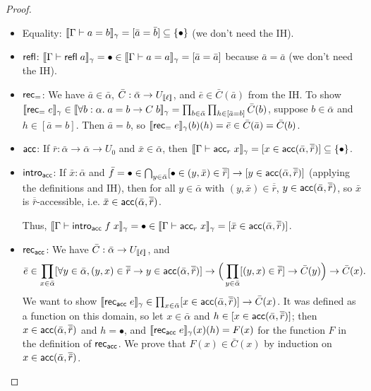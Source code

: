 \begin{proof}
\begin{itemize}
\item Equality: $\scott{\Gamma\vdash a=b}_\gamma=[\bar a=\bar b]\subseteq\{\bullet\}$ (we don't need the IH).
\item $\mathsf{refl}$: $\scott{\Gamma\vdash \refl\;a}_\gamma=\bullet\in\scott{\Gamma\vdash a=a}_\gamma=[\bar a=\bar a]$ because $\bar a=\bar a$ (we don't need the IH).
\item $\mathsf{rec}_=$: We have $\bar a\in\bar\alpha$, $\bar C:\bar\alpha\to U_{\llbracket \ell\rrbracket}$, and $\bar e\in\bar C(\bar a)$ from the IH. To show $\llbracket \mathsf{rec}_=\;e\rrbracket_\gamma\in\llbracket \forall b:\alpha.\;a=b\to C\;b\rrbracket_\gamma=\prod_{b\in\bar\alpha}\prod_{h\in[\bar a=b]}\bar C(b)$, suppose $b\in\bar\alpha$ and $h\in[\bar a=b]$. Then $\bar a=b$, so $\llbracket \mathsf{rec}_=\;e\rrbracket_\gamma(b)(h)=\bar e\in \bar C(\bar a)=\bar C(b)$.
\item $\mathsf{acc}$: If $\bar r:\bar\alpha\to\bar\alpha\to U_0$ and $\bar x\in\bar\alpha$, then $\scott{\Gamma\vdash\acc_r\;x}_\gamma=[x\in\acc(\bar\alpha,\overline{\bar r})]\subseteq\{\bullet\}$.
\item $\mathsf{intro}_{\mathsf{acc}}$: If $\bar x:\bar\alpha$ and $\bar f=\bullet\in\bigcap_{y\in\bar\alpha}[\bullet\in (y,\bar x)\in\overline{\bar r}]\to[y\in\mathsf{acc}(\bar\alpha,\overline{\bar r})]$ (applying the definitions and IH), then for all $y\in\bar\alpha$ with $(y,\bar x)\in\overline{\bar r}$, $y\in\mathsf{acc}(\bar\alpha,\overline{\bar r})$, so $\bar x$ is $\overline{\bar r}$-accessible, i.e. $\bar x\in\mathsf{acc}(\bar\alpha,\overline{\bar r})$.

Thus, $\scott{\Gamma\vdash\intro_\acc\;f\;x}_\gamma=\bullet\in\scott{\Gamma\vdash\acc_r\;x}_\gamma=[\bar x\in\acc(\bar\alpha,\overline{\bar r})]$.
\item $\mathsf{rec}_{\mathsf{acc}}$: We have $\bar C:\bar\alpha\to U_{\llbracket \ell\rrbracket}$, and
$$\bar e\in\prod_{x\in\bar\alpha}[\forall y\in\bar\alpha,(y,x)\in\overline{\bar r}\to y\in\mathsf{acc}(\bar\alpha,\overline{\bar r})]\to\Big(\prod_{y\in\bar\alpha}[(y,x)\in\overline{\bar r}]\to\bar C(y)\Big)\to\bar C(x).$$
We want to show $\llbracket \mathsf{rec}_{\mathsf{acc}}\;e\rrbracket_\gamma\in\prod_{x\in\bar\alpha}[x\in\mathsf{acc}(\bar\alpha,\overline{\bar r})]\to\bar C(x)$. It was defined as a function on this domain, so let $x\in\bar\alpha$ and $h\in[x\in\mathsf{acc}(\bar\alpha,\overline{\bar r})]$; then $x\in\mathsf{acc}(\bar\alpha,\overline{\bar r})$ and $h=\bullet$, and $\llbracket \mathsf{rec}_{\mathsf{acc}}\;e\rrbracket_\gamma(x)(h)=F(x)$ for the function $F$ in the definition of $\mathsf{rec}_{\mathsf{acc}}$. We prove that $F(x)\in\bar C(x)$ by induction on $x\in\mathsf{acc}(\bar\alpha,\overline{\bar r})$.


\end{itemize}
\end{proof}
